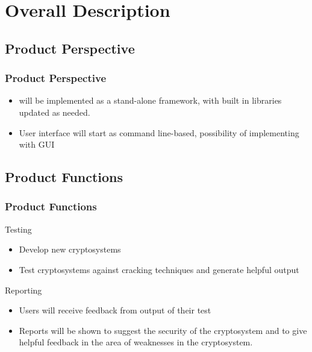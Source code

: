 
\section{Overall Description}


\subsection{Product Perspective}

\begin{frame} %
\frametitle{Product Perspective}
\begin{itemize}
  \item \cry{} will be implemented as a stand-alone framework, with built in libraries updated as needed.
  \item User interface will start as command line-based, possibility of implementing with GUI
\end{itemize}
\end{frame}


\subsection{Product Functions}
\begin{frame}
\frametitle{Product Functions}
Testing
\begin{itemize}
  \item Develop new cryptosystems
  \item Test cryptosystems against cracking techniques and generate helpful output
\end{itemize}
Reporting
\begin{itemize}
  \item Users will receive feedback from output of their test
  \item Reports will be shown to suggest the security of the cryptosystem and to give helpful feedback
    in the area of weaknesses in the cryptosystem.
\end{itemize}
\end{frame}

